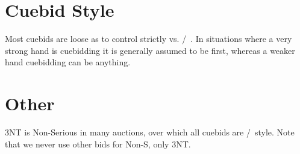 \documentclass[tom-ari]{subfile}
\begin{document}
\section{Cuebid Style}

Most cuebids are loose as to \first control strictly vs. \first/~\second.  In situations where a very strong hand is cuebidding it is generally assumed to be first, whereas a weaker hand cuebidding can be anything.

\section{Other}

3NT is Non-Serious in many auctions, over which all cuebids are \first/~\second style.  Note that we never use other bids for Non-S, only 3NT.
\end{document}
